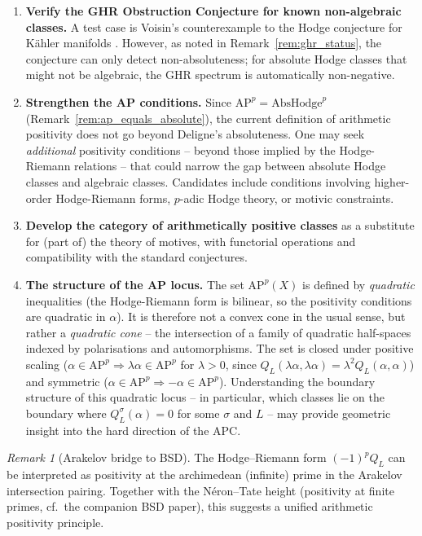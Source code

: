 \documentclass[aps,prd,twocolumn,superscriptaddress,nofootinbib]{revtex4-2}
\theoremstyle{definition}
\theoremstyle{remark}
\newtheorem{remark}[theorem]{Remark}
\begin{document}
\begin{enumerate}
\item \textbf{Verify the GHR Obstruction Conjecture for known non-algebraic classes.} A test case is Voisin's counterexample to the Hodge conjecture for K\"ahler manifolds \cite{Voisin2002b}. However, as noted in Remark~\ref{rem:ghr_status}, the conjecture can only detect non-absoluteness; for absolute Hodge classes that might not be algebraic, the GHR spectrum is automatically non-negative.

\item \textbf{Strengthen the AP conditions.} Since $\mathrm{AP}^p = \mathrm{AbsHodge}^p$ (Remark~\ref{rem:ap_equals_absolute}), the current definition of arithmetic positivity does not go beyond Deligne's absoluteness. One may seek \textit{additional} positivity conditions -- beyond those implied by the Hodge-Riemann relations -- that could narrow the gap between absolute Hodge classes and algebraic classes. Candidates include conditions involving higher-order Hodge-Riemann forms, $p$-adic Hodge theory, or motivic constraints.

\item \textbf{Develop the category of arithmetically positive classes} as a substitute for (part of) the theory of motives, with functorial operations and compatibility with the standard conjectures.

\item \textbf{The structure of the AP locus.} The set $\mathrm{AP}^p(X)$ is defined by \emph{quadratic} inequalities (the Hodge-Riemann form is bilinear, so the positivity conditions are quadratic in $\alpha$). It is therefore not a convex cone in the usual sense, but rather a \emph{quadratic cone} -- the intersection of a family of quadratic half-spaces indexed by polarisations and automorphisms. The set is closed under positive scaling ($\alpha \in \mathrm{AP}^p \Rightarrow \lambda\alpha \in \mathrm{AP}^p$ for $\lambda > 0$, since $Q_L(\lambda\alpha, \lambda\alpha) = \lambda^2 Q_L(\alpha, \alpha)$) and symmetric ($\alpha \in \mathrm{AP}^p \Rightarrow -\alpha \in \mathrm{AP}^p$). Understanding the boundary structure of this quadratic locus -- in particular, which classes lie on the boundary where $Q_L^\sigma(\alpha) = 0$ for some $\sigma$ and $L$ -- may provide geometric insight into the hard direction of the APC.
\end{enumerate}


\begin{remark}[Arakelov bridge to BSD]
\label{rem:arakelov-bridge}
The Hodge--Riemann form $(-1)^p Q_L$ can be interpreted as positivity at the archimedean (infinite) prime in the Arakelov intersection pairing. Together with the N\'eron--Tate height (positivity at finite primes, cf.\ the companion BSD paper), this suggests a unified arithmetic positivity principle.
\end{remark}
\end{document}
